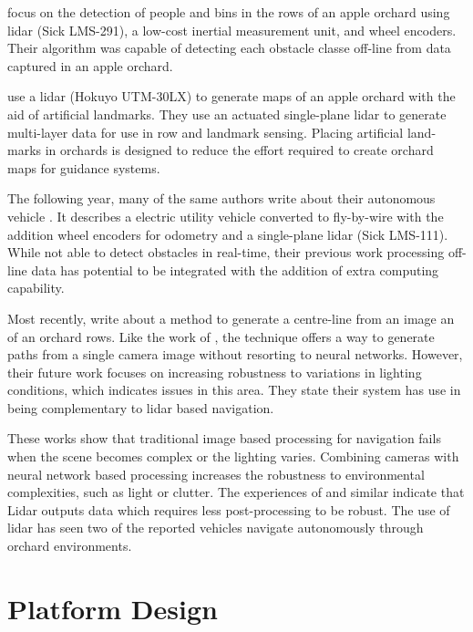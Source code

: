 \documentclass[preprint,authoryear,12pt]{elsarticle}
\begin{document}
        \cite{Freitas2012} focus on the detection of people and bins in the rows of an apple orchard using lidar (Sick LMS-291), a low-cost inertial measurement unit, and wheel encoders.
        Their algorithm was capable of detecting each obstacle classe off-line from data captured in an apple orchard.

        \cite{Zhang2014} use a lidar (Hokuyo UTM-30LX) to generate maps of an apple orchard with the aid of artificial landmarks.
        They use an actuated single-plane lidar to generate multi-layer data for use in row and landmark sensing.
        Placing artificial land-marks in orchards is designed to reduce the effort required to create orchard maps for guidance systems.

        The following year, many of the same authors write about their autonomous vehicle \citep{Bergerman2015}.
        It describes a electric utility vehicle converted to fly-by-wire with the addition wheel encoders for odometry and a single-plane lidar (Sick LMS-111).
        While not able to detect obstacles in real-time, their previous work processing off-line data \citep{Freitas2012} has potential to be integrated with the addition of extra computing capability.

        Most recently, \cite{Sharifi2015} write about a method to generate a centre-line from an image an of an orchard rows.
        Like the work of \cite{He2011}, the technique offers a way to generate paths from a single camera image without resorting to neural networks.
        However, their future work focuses on increasing robustness to variations in lighting conditions, which indicates issues in this area.
        They state their system has use in being complementary to lidar based navigation.

        These works show that traditional image based processing for navigation fails when the scene becomes complex or the lighting varies.
        Combining cameras with neural network based processing increases the robustness to environmental complexities, such as light or clutter.
        The experiences of \cite{Scarfe2012} and similar indicate that Lidar outputs data which requires less post-processing to be robust.
        The use of lidar has seen two of the reported vehicles navigate autonomously through orchard environments.



\section{Platform Design}
\end{document}

